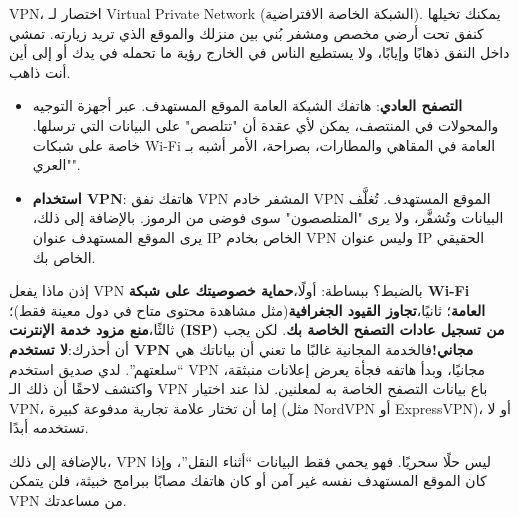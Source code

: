 


VPN، اختصار لـ Virtual Private Network (الشبكة الخاصة الافتراضية). يمكنك تخيلها كنفق تحت أرضي مخصص ومشفر بُني بين منزلك والموقع الذي تريد زيارته. تمشي داخل النفق ذهابًا وإيابًا، ولا يستطيع الناس في الخارج رؤية ما تحمله في يدك أو إلى أين أنت ذاهب.

\begin{itemize}
  \item \textbf{التصفح العادي}: هاتفك الشبكة العامة الموقع المستهدف. عبر أجهزة التوجيه والمحولات في المنتصف، يمكن لأي عقدة أن "تتلصص" على البيانات التي ترسلها. خاصة على شبكات Wi-Fi العامة في المقاهي والمطارات، بصراحة، الأمر أشبه بـ "العري".
  \item \textbf{استخدام VPN}: هاتفك نفق VPN المشفر خادم VPN الموقع المستهدف. تُغلَّف البيانات وتُشفَّر، ولا يرى "المتلصصون" سوى فوضى من الرموز. بالإضافة إلى ذلك، يرى الموقع المستهدف عنوان IP الخاص بخادم VPN وليس عنوان IP الحقيقي الخاص بك.
\end{itemize}

إذن ماذا يفعل VPN بالضبط؟ ببساطة: أولًا،\textbf{حماية خصوصيتك على شبكة Wi-Fi العامة}؛ ثانيًا،\textbf{تجاوز القيود الجغرافية}(مثل مشاهدة محتوى متاح في دول معينة فقط)؛ ثالثًا،\textbf{منع مزود خدمة الإنترنت (ISP) من تسجيل عادات التصفح الخاصة بك}. لكن يجب أن أحذرك:\textbf{لا تستخدم VPN مجاني!}فالخدمة المجانية غالبًا ما تعني أن بياناتك هي “سلعتهم”. لدي صديق استخدم VPN مجانيًا، وبدأ هاتفه فجأة يعرض إعلانات منبثقة، واكتشف لاحقًا أن ذلك الـ VPN باع بيانات التصفح الخاصة به لمعلنين. لذا عند اختيار VPN، إما أن تختار علامة تجارية مدفوعة كبيرة (مثل NordVPN أو ExpressVPN)، أو لا تستخدمه أبدًا.

بالإضافة إلى ذلك، VPN ليس حلًا سحريًا. فهو يحمي فقط البيانات “أثناء النقل”، وإذا كان الموقع المستهدف نفسه غير آمن أو كان هاتفك مصابًا ببرامج خبيثة، فلن يتمكن VPN من مساعدتك.


